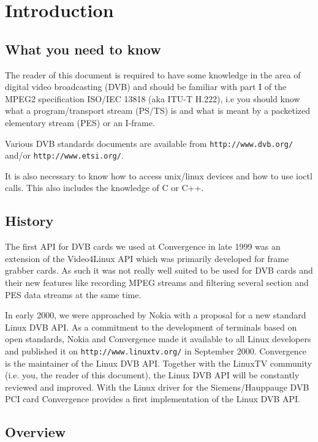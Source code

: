 \chapter{Introduction}

\section{What you need to know}

The reader of this document is required to have some knowledge in the
area of digital video broadcasting (DVB) and should be familiar with
part I of the MPEG2 specification ISO/IEC 13818 (aka ITU-T H.222),
i.e you should know what a program/transport stream (PS/TS) is and what is
meant by a packetized elementary stream (PES) or an I-frame.

Various DVB standards documents are available from
\texttt{http://www.dvb.org/} and/or \texttt{http://www.etsi.org/}.

It is also necessary to know how to access unix/linux devices and how
to use ioctl calls. This also includes the knowledge of C or C++.

\section{History}

The first API for DVB cards we used at Convergence in late 1999
was an extension of the Video4Linux API which was primarily 
developed for frame grabber cards.
As such it was not really well suited to be used for DVB cards and 
their new features like recording MPEG streams and filtering several 
section and PES data streams at the same time.

In early 2000, we were approached by Nokia with a proposal for a new
standard Linux DVB API.
As a commitment to the development of terminals based on open standards, 
Nokia and Convergence made it available to all Linux developers and
published it on \texttt{http://www.linuxtv.org/} in September 2000.
Convergence is the maintainer of the Linux DVB API.
Together with the LinuxTV community (i.e. you, the reader of this document), 
the Linux DVB API will be constantly reviewed and improved. 
With the Linux driver for the Siemens/Hauppauge DVB PCI card Convergence 
provides a first implementation of the Linux DVB API.


\newpage
\section{Overview}

